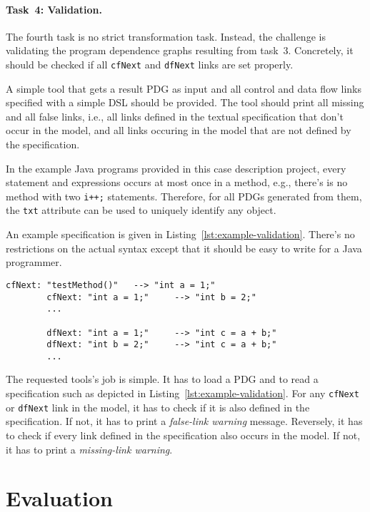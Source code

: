 \documentclass[submission]{eptcs}
\begin{document}
\paragraph{Task~4: Validation.}
\label{sec:task4-validation}

The fourth task is no strict transformation task.  Instead, the challenge is
validating the program dependence graphs resulting from task~3.  Concretely, it
should be checked if all \verb|cfNext| and \verb|dfNext| links are set
properly.

A simple tool that gets a result PDG as input and all control and data flow
links specified with a simple DSL should be provided.  The tool should print
all missing and all false links, i.e., all links defined in the textual
specification that don't occur in the model, and all links occuring in the
model that are not defined by the specification.

In the example Java programs provided in this case description project, every
statement and expressions occurs at most once in a method, e.g., there's is no
method with two \verb|i++;| statements.  Therefore, for all PDGs generated from
them, the \verb|txt| attribute can be used to uniquely identify any object.

An example specification is given in Listing~\ref{lst:example-validation}.
There's no restrictions on the actual syntax except that it should be easy to
write for a Java programmer.

\begin{lstlisting}[caption={An example validation DSL for result PDGs},label={lst:example-validation}]
        cfNext: "testMethod()"   --> "int a = 1;"
        cfNext: "int a = 1;"     --> "int b = 2;"
        ...

        dfNext: "int a = 1;"     --> "int c = a + b;"
        dfNext: "int b = 2;"     --> "int c = a + b;"
        ...
\end{lstlisting}

The requested tools's job is simple.  It has to load a PDG and to read a
specification such as depicted in Listing~\ref{lst:example-validation}.  For
any \verb|cfNext| or \verb|dfNext| link in the model, it has to check if it is
also defined in the specification.  If not, it has to print a \emph{false-link
  warning} message.  Reversely, it has to check if every link defined in the
specification also occurs in the model.  If not, it has to print a
\emph{missing-link warning}.


\section{Evaluation}
\label{sec:evaluation-criteria}
\end{document}
